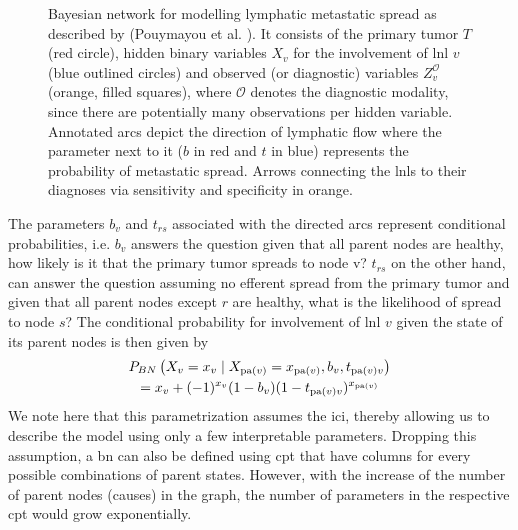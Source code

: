 \documentclass[\relativeRoot/main.tex]{subfiles}
\begin{document}
\begin{figure}
    \centering
    \def\svgwidth{0.35\textwidth}
    
    \caption{Bayesian network for modelling lymphatic metastatic spread as described by (Pouymayou et al. \cite{pouymayou_bayesian_2019}). It consists of the primary tumor $T$ (red circle), hidden binary variables $X_v$ for the involvement of \gls{lnl} $v$ (blue outlined circles) and observed (or diagnostic) variables $Z_v^\mathcal{O}$ (orange, filled squares), where $\mathcal{O}$ denotes the diagnostic modality, since there are potentially many observations per hidden variable. Annotated arcs depict the direction of lymphatic flow where the parameter next to it ($b$ in red and $t$ in blue) represents the probability of metastatic spread. Arrows connecting the \glspl{lnl} to their diagnoses via sensitivity and specificity in orange.}
    \label{fig:bn:graph}
\end{figure}

The parameters $b_v$ and $t_{rs}$   associated with the directed arcs represent conditional probabilities, i.e. $b_v$ answers the question given that all parent nodes are healthy, how likely is it that the primary tumor spreads to node v? $t_{rs}$ on the other hand, can answer the question assuming no efferent spread from the primary tumor and given that all parent nodes except $r$ are healthy, what is the likelihood of spread to node $s$? The conditional probability for involvement of \gls{lnl} $v$ given the state of its parent nodes is then given by
%
\begin{multline}
    P_{BN} \left( X_v = x_v \mid X_{\operatorname{pa}(v)} = x_{\operatorname{pa}(v)}, b_v, t_{\operatorname{pa}(v)v} \right) \\
    = x_v + (-1)^{x_v} (1 - b_v) (1 - t_{\operatorname{pa}(v)v})^{x_{\operatorname{pa}(v)}}
\end{multline}
%
We note here that this parametrization assumes the \gls{ici}, thereby allowing us to describe the model using only a few interpretable parameters. Dropping this assumption, a \gls{bn} can also be defined using \gls{cpt} that have columns for every possible combinations of parent states. However, with the increase of the number of parent nodes (causes) in the graph, the number of parameters in the respective \gls{cpt} would grow exponentially.
\end{document}
